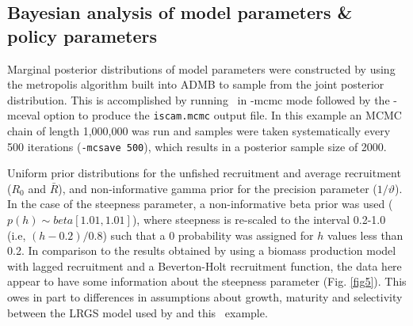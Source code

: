 \begin{multicols}{2}
\subsection{Bayesian analysis of model parameters \& policy parameters}
Marginal posterior distributions of model parameters were constructed by using the metropolis algorithm built into ADMB to sample from the joint posterior distribution.  This is accomplished by running \iscam\ in -mcmc mode followed by the -mceval option to produce the \verb"iscam.mcmc" output file.  In this example an MCMC chain of length 1,000,000 was run and samples were taken systematically every 500 iterations (\verb"-mcsave 500"), which results in a posterior sample size of 2000.

Uniform prior distributions for the unfished recruitment and average recruitment ($R_0$ and $\bar{R}$), and non-informative gamma prior for the precision parameter ($1/\vartheta$).  In the case of the steepness parameter, a non-informative beta prior was used ($p(h)\sim beta[1.01,1.01]$), where steepness is re-scaled to the interval 0.2-1.0 (i.e, $(h-0.2)/0.8$) such that a 0 probability was assigned for $h$ values less than 0.2.  In comparison to the results obtained by \cite{hilborn1997ecological} using a biomass production model with lagged recruitment and a Beverton-Holt recruitment function, the data here appear to have some information about the steepness parameter (Fig. \ref{fig5}).  This owes in part to differences in assumptions about growth, maturity and selectivity between the LRGS model used by \cite{hilborn1997ecological} and this \iscam\ example.


\end{multicols}
